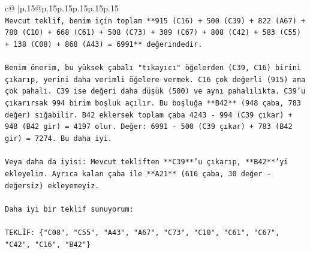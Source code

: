 \documentclass{article}
\begin{document}
{\begin{supertabular}{c@{$\;$}|p{.15\linewidth}@{}p{.15\linewidth}p{.15\linewidth}p{.15\linewidth}p{.15\linewidth}p{.15\linewidth}}
{{{\\ 
\texttt{Mevcut teklif, benim için toplam **915 (C16) + 500 (C39) + 822 (A67) + 780 (C10) + 668 (C61) + 508 (C73) + 389 (C67) + 808 (C42) + 583 (C55) + 138 (C08) + 868 (A43) = 6991** değerindedir.} \\
\\ 
\texttt{Benim önerim, bu yüksek çabalı "tıkayıcı" öğelerden (C39, C16) birini çıkarıp, yerini daha verimli öğelere vermek. C16 çok değerli (915) ama çok pahalı. C39 ise değeri daha düşük (500) ve aynı pahalılıkta. C39'u çıkarırsak 994 birim boşluk açılır. Bu boşluğa **B42** (948 çaba, 783 değer) sığabilir. B42 eklersek toplam çaba 4243 {-} 994 (C39 çıkar) + 948 (B42 gir) = 4197 olur. Değer: 6991 {-} 500 (C39 çıkar) + 783 (B42 gir) = 7274. Bu daha iyi.} \\
\\ 
\texttt{Veya daha da iyisi: Mevcut tekliften **C39**'u çıkarıp, **B42**'yi ekleyelim. Ayrıca kalan çaba ile **A21** (616 çaba, 30 değer {-} değersiz) ekleyemeyiz.} \\
\\ 
\texttt{Daha iyi bir teklif sunuyorum:} \\
\\ 
\texttt{TEKLİF: \{"C08", "C55", "A43", "A67", "C73", "C10", "C61", "C67", "C42", "C16", "B42"\}} \\
            }
        }
    }
     \\ \\


\end{supertabular}}
\end{document}
